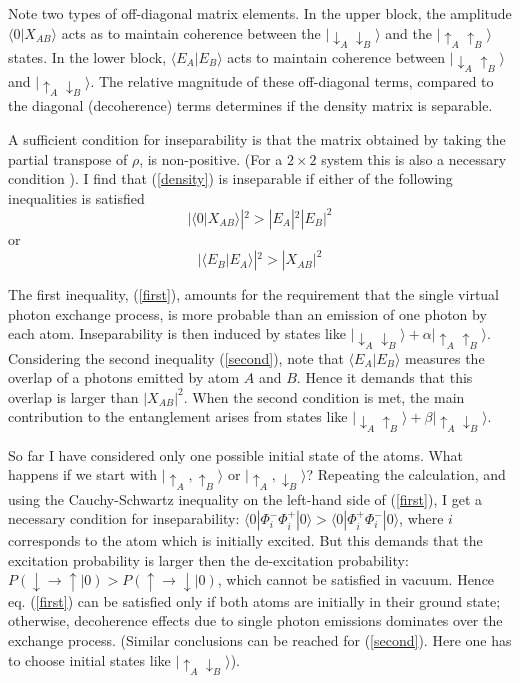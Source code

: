 \documentclass[12pt]{article}
\newcommand{\beq}{\begin{equation}}
\newcommand{\eeq}{\end{equation}}
\def \la {\langle}
\def \ra {\rangle}
\def \up {\uparrow}
\def \down {\downarrow}
\begin{document}
Note two types of off-diagonal matrix elements.
In the upper block,  the amplitude
$\la 0| X_{AB}\ra$ acts as to maintain coherence between the
$|\down_A\down_B\ra$ and the $|\up_A\up_B\ra$ states.
In the lower block, $\la E_A|E_B\ra$
acts to maintain coherence
between $|\down_A\up_B\ra$ and $|\up_A\down_B\ra$.
The relative magnitude of these off-diagonal terms, compared
to the diagonal (decoherence) terms
determines if the density matrix is separable.

A sufficient condition \cite{peres} for inseparability is
that the matrix obtained by taking the partial
transpose\cite{pt} of $\rho$, is non-positive. (For a $2\times 2$ system
this is also a necessary condition \cite{iff}).
I find  that (\ref{density}) is inseparable
if either of the following inequalities is satisfied
\beq
|\la 0|X_{AB}\ra|^2 > |E_A|^2 |E_B|^2
\label{first}
\eeq
or
\beq
|\la E_B|E_A\ra|^2 > |X_{AB}|^2
\label{second}
\eeq

The first inequality, (\ref{first}),
amounts for the requirement that the
single virtual photon exchange process,  is more
probable than an emission
of one photon by each atom.
Inseparability is then induced by states like
$|\down_A\down_B\ra + \alpha |\up_A\up_B\ra$.
Considering the second inequality (\ref{second}),
note that $\la E_A|E_B\ra$ measures the overlap
of a photons emitted by atom $A$ and $B$. Hence
it demands that  this overlap is larger than $|X_{AB}|^2$.
When the second condition
is met, the main contribution to the entanglement arises from states like
 $|\down_A\up_B\ra + \beta |\up_A\down_B\ra$.


So far I have considered only one possible
initial state of the atoms.
What happens if we start with
$|\up_A, \up_B\ra$ or $|\up_A, \down_B\ra$?
Repeating the calculation,
and using the
Cauchy-Schwartz inequality on the left-hand side of
(\ref{first}), I get
a necessary condition for inseparability:
$ \la 0|\Phi^-_i\Phi^+_i|0\ra  > \la 0|\Phi^+_i\Phi_i^-|0\ra$,
where $i$ corresponds to the atom which is initially excited.
But this demands that  the excitation probability
is larger then the de-excitation probability:
$
P(\down \to \up|0 ) > P(\up \to \down |0)
$,
which cannot be satisfied in vacuum.
Hence eq. (\ref{first}) can be satisfied only if
both atoms are initially in their ground state;
otherwise, decoherence effects due to single photon emissions
dominates over the exchange process.
(Similar conclusions can be reached for (\ref{second}).
Here one has to choose initial states like
$|\up_A\down_B\ra$).
\end{document}

